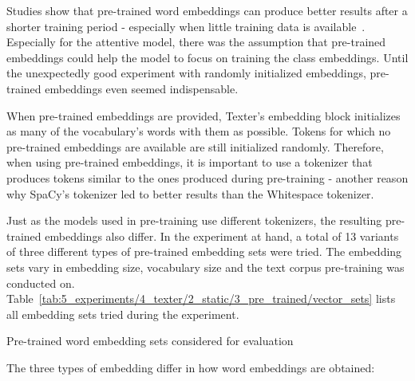 Studies show that pre-trained word embeddings can produce better results after a shorter training period - especially when little training data is available~\cite{}. Especially for the attentive model, there was the assumption that pre-trained embeddings could help the model to focus on training the class embeddings. Until the unexpectedly good experiment with randomly initialized embeddings, pre-trained embeddings even seemed indispensable.

When pre-trained embeddings are provided, Texter's embedding block initializes as many of the vocabulary's words with them as possible. Tokens for which no pre-trained embeddings are available are still initialized randomly. Therefore, when using pre-trained embeddings, it is important to use a tokenizer that produces tokens similar to the ones produced during pre-training - another reason why SpaCy's tokenizer led to better results than the Whitespace tokenizer.

Just as the models used in pre-training use different tokenizers, the resulting pre-trained embeddings also differ. In the experiment at hand, a total of 13 variants of three different types of pre-trained embedding sets were tried. The embedding sets vary in embedding size, vocabulary size and the text corpus pre-training was conducted on. Table~\ref{tab:5_experiments/4_texter/2_static/3_pre_trained/vector_sets} lists all embedding sets tried during the experiment.

\begin{table}[t]
    \centering
    
    \caption{Pre-trained word embedding sets considered for evaluation}
    \label{tab:5_experiments/4_texter/2_static/3_pre_trained/vector_sets}
\end{table}

The three types of embedding differ in how word embeddings are obtained:

